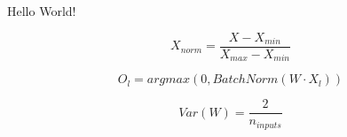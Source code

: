 \documentclass{article}
\begin{document}
Hello World!

$$ X_{norm}=\frac{X-X_{min}}{X_{max}-X_{min}} $$

$$ O_{l}=argmax(0, BatchNorm(W \cdot X_{l})) $$

$$ Var(W)=\frac{2}{n_{inputs}} $$
\end{document}
